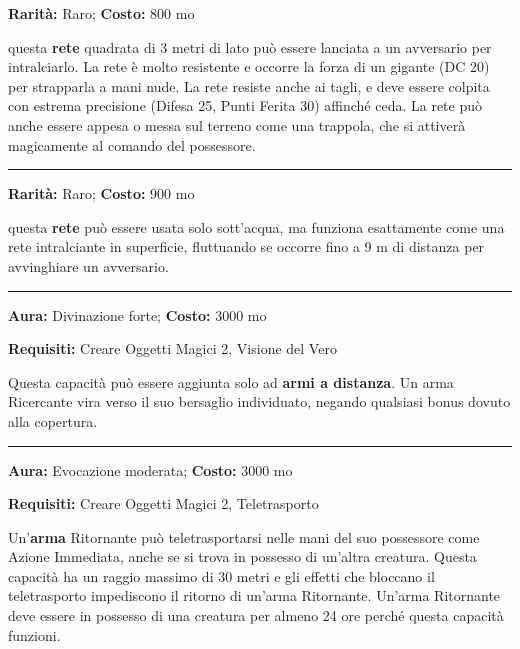 \begin{multicols}{2}
\textbf{Rarità:} Raro; \textbf{Costo:} 800 mo

questa \textbf{rete} quadrata di 3 metri di lato può essere lanciata a un avversario per intralciarlo. La rete è molto resistente e occorre la forza di un gigante (DC 20) per strapparla a mani nude. La rete resiste anche ai tagli, e deve essere colpita con estrema precisione (Difesa 25, Punti Ferita 30) affinché ceda. La rete può anche essere appesa o messa sul terreno come una trappola, che si attiverà magicamente al comando del possessore.

\smallskip\noindent\rule{\linewidth}{2pt}  \hypertarget{ReteIntrappolante}{}\medskip{}\noindent\label{ReteIntrappolante}

\textbf{Rarità:} Raro; \textbf{Costo:} 900 mo

questa \textbf{rete} può essere usata solo sott'acqua, ma funziona esattamente come una rete intralciante in superficie, fluttuando se occorre fino a 9 m di distanza per avvinghiare un avversario.

\smallskip\noindent\rule{\linewidth}{2pt}  \hypertarget{Ricercante}{}\medskip{}\noindent\label{Ricercante}

\textbf{Aura:} Divinazione forte; \textbf{Costo:} 3000 mo

\textbf{Requisiti:} Creare Oggetti Magici 2, Visione del Vero

Questa capacità può essere aggiunta solo ad \textbf{armi a distanza}. Un arma Ricercante vira verso il suo bersaglio individuato, negando qualsiasi bonus dovuto alla copertura.

\smallskip\noindent\rule{\linewidth}{2pt}  \hypertarget{Ritornante}{}\medskip{}\noindent\label{Ritornante}

\textbf{Aura:} Evocazione moderata; \textbf{Costo:} 3000 mo

\textbf{Requisiti:} Creare Oggetti Magici 2, Teletrasporto

Un'\textbf{arma} Ritornante può teletrasportarsi nelle mani del suo possessore come Azione Immediata, anche se si trova in possesso di un'altra creatura. Questa capacità ha un raggio massimo di 30 metri e gli effetti che bloccano il teletrasporto impediscono il ritorno di un'arma Ritornante. Un'arma Ritornante deve essere in possesso di una creatura per almeno 24 ore perché questa capacità funzioni.


\end{multicols}
